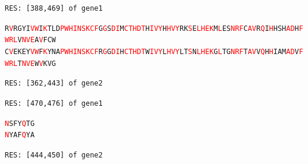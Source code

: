 \documentclass[phd,tocprelim]{cornell}
\begin{document}
\begin{flushleft}
    \singlespacing
\footnotesize 
\texttt{RES: [388,469] of gene1}           

\texttt{R\textcolor{red}{V}RGYI\textcolor{red}{V}\textcolor{red}{W}I\textcolor{red}{K}TLD\textcolor{red}{P}\textcolor{red}{W}\textcolor{red}{H}\textcolor{red}{I}\textcolor{red}{N}\textcolor{red}{S}\textcolor{red}{K}\textcolor{red}{C}\textcolor{red}{F}G\textcolor{red}{G}S\textcolor{red}{D}\textcolor{red}{I}M\textcolor{red}{C}\textcolor{red}{T}\textcolor{red}{H}\textcolor{red}{D}\textcolor{red}{T}H\textcolor{red}{I}\textcolor{red}{V}\textcolor{red}{Y}H\textcolor{red}{H}\textcolor{red}{V}\textcolor{red}{Y}RK\textcolor{red}{S}E\textcolor{red}{L}\textcolor{red}{H}\textcolor{red}{E}\textcolor{red}{K}M\textcolor{red}{L}ES\textcolor{red}{N}\textcolor{red}{R}\textcolor{red}{F}C\textcolor{red}{A}\textcolor{red}{V}R\textcolor{red}{Q}I\textcolor{red}{H}HSH\textcolor{red}{A}\textcolor{red}{D}H\textcolor{red}{F}\textcolor{red}{W}\textcolor{red}{R}\textcolor{red}{L}V\textcolor{red}{N}\textcolor{red}{V}\textcolor{red}{E}A\textcolor{red}{V}FCW} \\
\texttt{C\textcolor{red}{V}EKEY\textcolor{red}{V}\textcolor{red}{W}F\textcolor{red}{K}YNA\textcolor{red}{P}\textcolor{red}{W}\textcolor{red}{H}\textcolor{red}{I}\textcolor{red}{N}\textcolor{red}{S}\textcolor{red}{K}\textcolor{red}{C}\textcolor{red}{F}R\textcolor{red}{G}G\textcolor{red}{D}\textcolor{red}{I}H\textcolor{red}{C}\textcolor{red}{T}\textcolor{red}{H}\textcolor{red}{D}\textcolor{red}{T}W\textcolor{red}{I}\textcolor{red}{V}\textcolor{red}{Y}L\textcolor{red}{H}\textcolor{red}{V}\textcolor{red}{Y}LT\textcolor{red}{S}N\textcolor{red}{L}\textcolor{red}{H}\textcolor{red}{E}\textcolor{red}{K}G\textcolor{red}{L}TG\textcolor{red}{N}\textcolor{red}{R}\textcolor{red}{F}T\textcolor{red}{A}\textcolor{red}{V}V\textcolor{red}{Q}H\textcolor{red}{H}IAM\textcolor{red}{A}\textcolor{red}{D}V\textcolor{red}{F}\textcolor{red}{W}\textcolor{red}{R}\textcolor{red}{L}T\textcolor{red}{N}\textcolor{red}{V}\textcolor{red}{E}W\textcolor{red}{V}KVG}

\texttt{RES: [362,443] of gene2}

\texttt{RES: [470,476] of gene1}

\texttt{\textcolor{red}{N}SFY\textcolor{red}{Q}TG} \\
\texttt{\textcolor{red}{N}YAF\textcolor{red}{Q}YA}

\texttt{RES: [444,450] of gene2}

\normalsize
\normalspacing
\end{flushleft}
\end{document}
